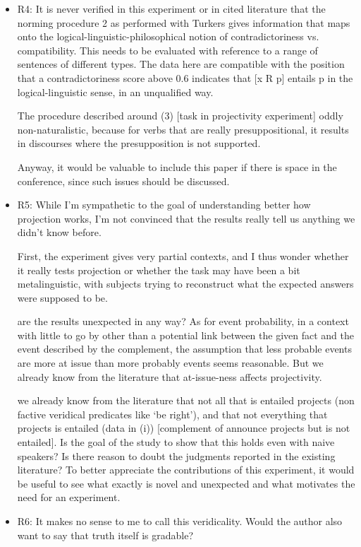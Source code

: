 \documentclass[11pt,fleqn]{article}
\newcommand{\6}{\mbox{$[\hspace*{-.6mm}[$}}
\newcommand{\9}{\mbox{$]\hspace*{-.6mm}]$}}
\begin{document}
\begin{itemize}
\item R4: It is never verified in this experiment or in cited literature that the norming procedure 2 as performed with Turkers gives information that maps onto the logical-linguistic-philosophical notion of contradictoriness vs. compatibility.  This needs to be evaluated with reference to a range of sentences of different types.  The data here are compatible with the position that a contradictoriness score above 0.6 indicates that [x R p] entails p in the logical-linguistic sense, in an unqualified way.

The procedure described around (3) [task in projectivity experiment] oddly non-naturalistic, because for verbs that are really presuppositional, it results in discourses where the presupposition is not supported.

Anyway, it would be valuable to include this paper if there is space in the conference, since such issues should be discussed.

\item R5: While I’m sympathetic to the goal of understanding better how projection works, I’m not convinced that the results really tell us anything we didn’t know before.

First, the experiment gives very partial contexts, and I thus wonder whether it really tests projection or whether the task may have been a bit metalinguistic, with subjects trying to reconstruct what the expected answers were supposed to be.

are the results unexpected in any way? As for event probability, in a context with little to go by other than a potential link between the given fact and the event described by the complement, the assumption that less probable events are more at issue than more probably events seems reasonable. But we already know from the literature that at-issue-ness affects projectivity.

we already know from the literature that not all that is entailed projects (non factive veridical predicates like ‘be right’), and that not everything that projects is entailed (data in (i)) [complement of announce projects but is not entailed]. Is the goal of the study to show that this holds even with naive speakers? Is there reason to doubt the judgments reported in the existing literature? To better appreciate the contributions of this experiment, it would be useful to see what exactly is novel and unexpected and what motivates the need for an experiment.

\item R6:  It makes no sense to me to call this veridicality.  Would the author also want to say that truth itself is gradable? 


\end{itemize}
\end{document}
